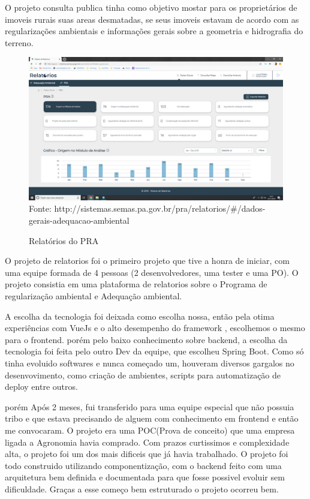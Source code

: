 O projeto consulta publica tinha como objetivo mostar para os proprietários de imoveis rurais suas areas desmatadas, se seus imoveis estavam de acordo com as regularizações ambientais e informações gerais sobre a geometria e hidrografia do terreno.


\begin{figure}[H]
\centering
\caption{Relatórios do PRA} %
\includegraphics[scale=0.22]{relatorios-pra}\\  %
{\small Fonte: http://sistemas.semas.pa.gov.br/pra/relatorios/#/dados-gerais-adequacao-ambiental} %
\label{fig:exemplo} %
\end{figure}

O projeto de relatorios foi o primeiro projeto que tive a honra de iniciar, com uma equipe formada de 4 pessoas (2 desenvolvedores, uma tester e uma PO).
O projeto consistia em uma plataforma de relatorios sobre o Programa de regularização ambiental e Adequação ambiental.

A escolha da tecnologia foi deixada como escolha nossa, então pela otima experiências com VueJs e o alto desempenho do framework , escolhemos o mesmo para o frontend.
porém pelo baixo conhecimento sobre backend, a escolha da tecnologia foi feita pelo outro Dev da equipe, que escolheu Spring Boot.
Como só tinha evoluido softwares e nunca começado um, houveram diversos gargalos no desenvovimento, como criação de ambientes, scripts para automatização de deploy entre outros.

porém Após 2 meses, fui transferido para uma equipe especial que não possuia tribo e que estava precisando de alguem com conhecimento em frontend e então me convocaram.
O projeto era uma POC(Prova de conceito) que uma empresa ligada a Agronomia havia comprado. Com prazos curtissimos e complexidade alta, o projeto foi um dos mais dificeis que já havia trabalhado.
O projeto foi todo construido utilizando componentização, com o backend feito com uma arquitetura bem definida e documentada para que fosse possivel evoluir sem dificuldade. Graças a esse começo bem estruturado o projeto ocorreu bem.

